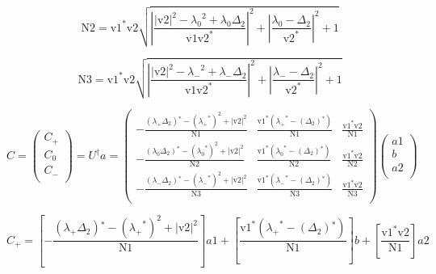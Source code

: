 \documentclass{article}
\begin{document}
\begin{equation}
\text{N2}=\text{v1}^* \text{v2} \sqrt{{\left| \frac{\left|\text{v2}\right|^2-\text{$\lambda_0$}^2+\text{$\lambda_0$} \Delta _2}{\text{v1} \text{v2}^*}\right|}^2+{\left| \frac{\text{$\lambda_0$}-\Delta _2}{\text{v2}^*}\right|}^2+1}
\end{equation}

\begin{equation}
\text{N3}=\text{v1}^* \text{v2} \sqrt{{\left| \frac{\left|\text{v2}\right|^2-\text{$\lambda_-$}^2+\text{$\lambda_-$} \Delta _2}{\text{v1} \text{v2}^*}\right| }^2+{\left| \frac{\text{$\lambda_-$}-\Delta _2}{\text{v2}^*}\right| }^2+1}
\end{equation}

$$
C= \begin{pmatrix}
  C_+\\
  C_0 \\
  C_-
  \\
\end{pmatrix} =  U^{\dagger} a=\left(
\begin{array}{ccc}
 -\frac{\left(\text{$\lambda_+$} \Delta _2\right){}^*-\left(\text{$\lambda_+$}^*\right)^2+\left|\text{v2}\right|^2}{\text{N1}} &\frac{\text{v1}^* \left(\text{$\lambda_+$}^*-\left(\Delta _2\right){}^*\right)}{\text{N1}} & \frac{\text{v1}^* \text{v2}}{\text{N1}} \\
 -\frac{\left(\text{$\lambda_0$} \Delta _2\right){}^*-\left(\text{$\lambda_0$}^*\right)^2+\left|\text{v2}\right|^2}{\text{N2}} &\frac{\text{v1}^* \left(\text{$\lambda_0$}^*-\left(\Delta _2\right){}^*\right)}{\text{N2}} & \frac{\text{v1}^* \text{v2}}{\text{N2}} \\
 -\frac{\left(\text{$\lambda_-$} \Delta _2\right){}^*-\left(\text{$\lambda_-$}^*\right)^2+\left|\text{v2}\right|^2}{\text{N3}} &\frac{\text{v1}^* \left(\text{$\lambda_-$}^*-\left(\Delta _2\right){}^*\right)}{\text{N3}} & \frac{\text{v1}^* \text{v2}}{\text{N3}} \\
\end{array}
\right)
\begin{pmatrix}
  a1\\
  b \\
  a2 \\
\end{pmatrix}
$$

\begin{equation}
    C_+= \left[  -\frac{\left(\text{$\lambda_+$} \Delta _2\right){}^*-\left(\text{$\lambda_+$}^*\right)^2+\left|\text{v2}\right|^2}{\text{N1}} \right] a1 + \left[ \frac{\text{v1}^* \left(\text{$\lambda_+$}^*-\left(\Delta _2\right){}^*\right)}{\text{N1}} \right] b + \left[\frac{\text{v1}^* \text{v2}}{\text{N1}}\right] a2
\end{equation}
\end{document}

